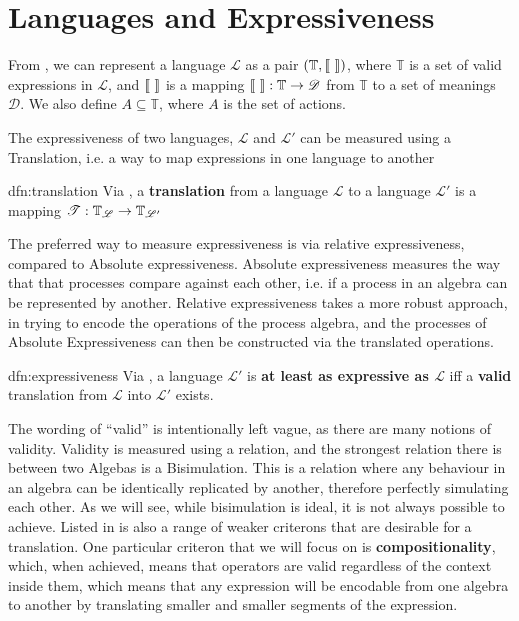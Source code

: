 \documentclass[../hons_project.tex]{subfiles}
\begin{document}
    
\section{Languages and Expressiveness}\label{ssec:language}

From \cite{DBLP:conf/fossacs/Glabbeek18}, we can represent a language $\mathscr{L}$ as a pair $(\mathbb{T}, \llbracket \,\, \rrbracket)$, where $\mathbb{T}$ is a set of valid expressions in $\mathscr{L}$, and $\llbracket \,\, \rrbracket$ is a mapping $\llbracket \,\, \rrbracket : \mathbb{T} \to \mathscr{D}$ from $\mathbb{T}$ to a set of meanings $\mathscr{D}$. We also define $A \subseteq \mathbb{T}$, where $A$ is the set of actions.

The expressiveness of two languages, $\mathscr{L}$ and $\mathscr{L}'$ can be measured using a Translation, i.e. a way to map expressions in one language to another
\begin{dfn}[Translation]{dfn:translation}{}
   Via  \cite{DBLP:conf/fossacs/Glabbeek18}, a \textbf{translation} from a language $\mathscr{L}$ to a language $\mathscr{L'}$ is a mapping $\mathscr{T} : \mathbb{T}_{\mathscr{L}} \to \mathbb{T}_{\mathscr{L}'}$
\end{dfn}

The preferred way to measure expressiveness is via relative expressiveness, compared to Absolute expressiveness. \cite{parrowExpressivenessProcessAlgebras2008} Absolute expressiveness measures the way that that processes compare against each other, i.e. if a process in an algebra can be represented by another. Relative expressiveness takes a more robust approach, in trying to encode the operations of the process algebra, and the processes of Absolute Expressiveness can then be constructed via the translated operations. 

\begin{dfn}[Expressiveness]{dfn:expressiveness}{}
   Via  \cite{DBLP:conf/fossacs/Glabbeek18}, a language $\mathscr{L}'$ is \textbf{at least as expressive as $\mathscr{L}$} iff a \textbf{valid} translation from $\mathscr{L}$ into $\mathscr{L}'$ exists.
\end{dfn}

The wording of ``valid'' is intentionally left vague, as there are many notions of validity. Validity is measured using a relation, and the strongest relation there is between two Algebas is a Bisimulation. This is a relation where any behaviour in an algebra can be identically replicated by another, therefore perfectly simulating each other. As we will see, while bisimulation is ideal, it is not always possible to achieve. Listed in \cite{parrowExpressivenessProcessAlgebras2008} is also a range of weaker criterons that are desirable for a translation. One particular criteron that we will focus on is \textbf{compositionality}, which, when achieved, means that operators are valid regardless of the context inside them, which means that any expression will be encodable from one algebra to another by translating smaller and smaller segments of the expression.
\end{document}
